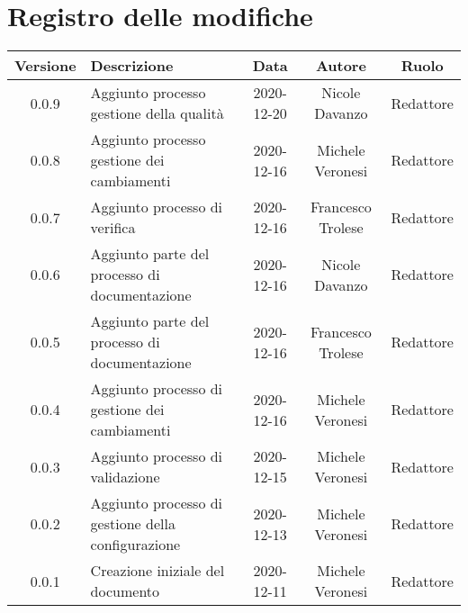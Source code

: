 \section*{Registro delle modifiche}

\begin{center}
	\begin{longtable}{|c|p{5cm}|c|c|c|}
	\hline
	\rowcolor{lighter-grayer}
	\textbf{Versione} & \textbf{Descrizione} & \textbf{Data} & \textbf{Autore} & \textbf{Ruolo} \\
	\hline
	\endfirsthead


	\hline
	0.0.9 & Aggiunto processo gestione della qualità & 2020-12-20 & Nicole Davanzo & Redattore \\
	0.0.8 & Aggiunto processo gestione dei cambiamenti & 2020-12-16 & Michele Veronesi & Redattore \\
	0.0.7 & Aggiunto processo di verifica & 2020-12-16 & Francesco Trolese & Redattore \\
	0.0.6 & Aggiunto parte del processo di documentazione & 2020-12-16 & Nicole Davanzo & Redattore \\
	0.0.5 & Aggiunto parte del processo di documentazione & 2020-12-16 & Francesco Trolese & Redattore \\
	0.0.4 & Aggiunto processo di gestione dei cambiamenti & 2020-12-16 & Michele Veronesi & Redattore \\
	0.0.3 & Aggiunto processo di validazione & 2020-12-15 & Michele Veronesi & Redattore \\
	0.0.2 & Aggiunto processo di gestione della configurazione & 2020-12-13 & Michele Veronesi & Redattore \\
	0.0.1 & Creazione iniziale del documento & 2020-12-11 & Michele Veronesi & Redattore \\
	\hline

	\end{longtable}
\end{center}